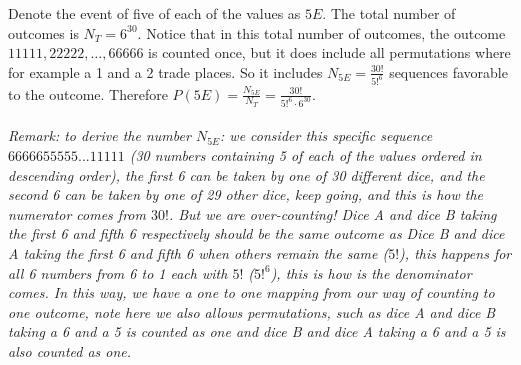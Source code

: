 
\setcounter{theorem}{35}
\begin{exercise}[BH.1.36]
\begin{solution}
	 Denote the event of five of each of the values as $5E$. The total number of outcomes is $N_{T}=6^{30}$.  Notice that in this total number of outcomes, the outcome $11111,22222,\ldots,66666$ is counted once, but it does include all permutations where for example a 1 and a 2 trade places. So it includes $N_{5E}=\frac{30!}{5!^6}$ sequences favorable to the outcome. Therefore $P(5E) = \frac{N_{5E}}{N_{T}} = \frac{30!}{5!^6\cdot 6^{30}}$.\\~\\
	 
	\textit{Remark: to derive the number $N_{5E}$: we consider this specific sequence $6666655555...11111$ (30 numbers containing 5 of each of the values ordered in descending order), the first 6 can be taken by one of 30 different dice, and the second 6 can be taken by one of 29 other dice, keep going, and this is how the numerator comes from $30!$. But we are over-counting! Dice A and dice B taking the first 6 and fifth 6 respectively should be the same outcome as Dice B and dice A taking the first 6 and fifth 6 when others remain the same ($5!$), this happens for all 6 numbers from 6 to 1 each with $5!$ ($5!^6$), this is how is the denominator comes. In this way, we have a one to one mapping from our way of counting to one outcome, note here we also allows permutations, such as dice A and dice B taking a 6 and a 5 is counted as one and dice B and dice A taking a 6 and a 5 is also counted as one.}
\end{solution}
\end{exercise}


